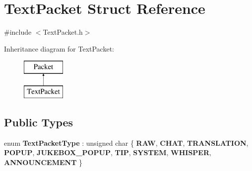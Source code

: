 \hypertarget{struct_text_packet}{}\section{Text\+Packet Struct Reference}
\label{struct_text_packet}


{\ttfamily \#include $<$Text\+Packet.\+h$>$}

Inheritance diagram for Text\+Packet\+:\begin{figure}[H]
\begin{center}
\leavevmode
\includegraphics[height=2.000000cm]{struct_text_packet}
\end{center}
\end{figure}
\subsection*{Public Types}
\begin{DoxyCompactItemize}
\item 
\mbox{\label{struct_text_packet_ab7fd3a07866f68f65f0dcde5ac175210}} 
enum {\bfseries Text\+Packet\+Type} \+: unsigned char \{ \newline
{\bfseries R\+AW}, 
{\bfseries C\+H\+AT}, 
{\bfseries T\+R\+A\+N\+S\+L\+A\+T\+I\+ON}, 
{\bfseries P\+O\+P\+UP}, 
\newline
{\bfseries J\+U\+K\+E\+B\+O\+X\+\_\+\+P\+O\+P\+UP}, 
{\bfseries T\+IP}, 
{\bfseries S\+Y\+S\+T\+EM}, 
{\bfseries W\+H\+I\+S\+P\+ER}, 
\newline
{\bfseries A\+N\+N\+O\+U\+N\+C\+E\+M\+E\+NT}
 \}
\end{DoxyCompactItemize}
